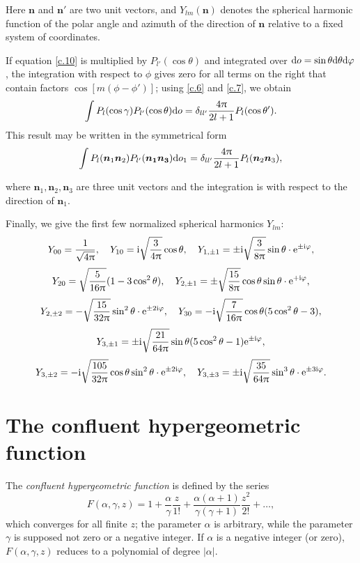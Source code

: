 Here $ \bm{n} $ and $ \bm{n'} $ are two unit vectors, and $ Y_{lm}(\bm{n}) $ denotes the spherical harmonic function of the polar angle and azimuth of the direction of $ \bm{n} $ relative to a fixed system of coordinates.

If equation \eqref{c.10} is multiplied by $ P_{l'}(\cos \theta) $ and integrated over $ \mathrm{d} o = \sin \theta \mathrm{d}\theta \mathrm{d}\varphi $, the integration with respect to $\phi$ gives zero for all terms on the right that contain factors $ \cos [m (\phi-  \phi')] $; using \eqref{c.6} and \eqref{c.7}, we obtain
\[ \int P_l(\cos\gamma)P_{l'}(\cos\theta)\mathrm{d} o=\delta_{ll'}\frac{4\uppi}{2l+1}P_l(\cos\theta') .\]
This result may be written in the symmetrical form
\begin{equation}\label{c.12}
\int P_l(\bm{n}_1\bm{n}_2)P_{l'}(\bm{n_1}\bm{n_3})\mathrm{d} o_1=\delta_{ll'}\frac{4\uppi}{2l+1}P_l(\bm{n}_2\bm{n}_3),
\end{equation}



where $ \bm{n}_1 , \bm{n}_2, \bm{n}_3$ are three unit vectors and the integration is with respect to the direction of $ \bm{n}_1 $.

Finally, we give the first few normalized spherical harmonics $ Y_{lm} $:
\[ Y_{00}=\frac{1}{\sqrt{4\uppi}},\quad Y_{10}=\mathrm{i}\sqrt{\frac{3}{4\uppi}}\cos\theta,\quad Y_{1,\pm1}=\pm\mathrm{i}\sqrt{\frac{3}{8\uppi}}\sin\theta\cdot\mathrm{e}^{\pm\mathrm{i}\varphi}, \]
\[ Y_{20}=\sqrt{\frac{5}{16\uppi}}(1-3\cos^2\theta),\quad Y_{2,\pm1}=\pm\sqrt{\frac{15}{8\uppi}}\cos\theta\sin\theta\cdot\mathrm{e}^{+\mathrm{i}\varphi}, \]
\[ Y_{2,\pm2}=-\sqrt{\frac{15}{32\uppi}}\sin^2\theta\cdot\mathrm{e}^{\pm2\mathrm{i}\varphi},\quad Y_{30}=-\mathrm{i}\sqrt{\frac{7}{16\uppi}}\cos\theta(5\cos^2\theta-3), \]
\[ Y_{3,\pm1}=\pm\mathrm{i}\sqrt{\frac{21}{64\uppi}}\sin\theta(5\cos^2\theta-1)\mathrm{e}^{\pm\mathrm{i}\varphi}, \]
\[ Y_{3,\pm2}=-\mathrm{i}\sqrt{\frac{105}{32\uppi}}\cos\theta\sin^2\theta\cdot\mathrm{e}^{\pm2\mathrm{i}\varphi},\quad Y_{3,\pm3}=\pm\mathrm{i}\sqrt{\frac{35}{64\uppi}}\sin^3\theta\cdot\mathrm{e}^{\pm3\mathrm{i}\varphi}. \]
\section{The confluent hypergeometric function}\label{The confluent hypergeometric function}
The \textit{confluent hypergeometric function} is defined by the series
\begin{equation}\label{d.1}
F(\alpha,\gamma,z)=1+\frac{\alpha}{\gamma}\frac{z}{1!}+\frac{\alpha(\alpha+1)}{\gamma(\gamma+1)}\frac{z^2}{2!}+\dots,
\end{equation}
which converges for all finite $ z $; the parameter $\alpha$ is arbitrary, while the parameter $\gamma$ is supposed not zero or a negative integer. If $\alpha$ is a negative integer (or zero), $ F (\alpha, \gamma, z) $ reduces to a polynomial of degree $ |\alpha| $.

